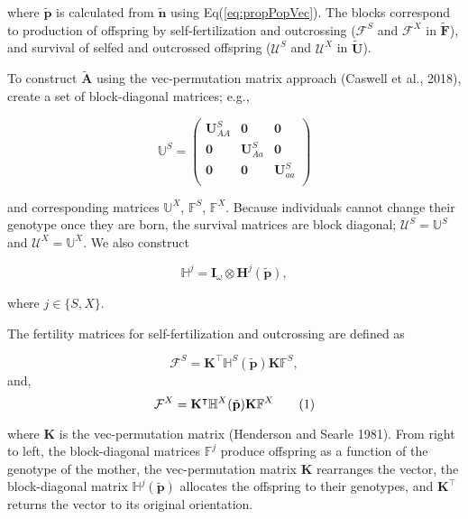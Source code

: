 \documentclass[11pt]{article}
\newcommand\numberthis{\addtocounter{equation}{1}\tag{\theequation}}
\def\mbf#1{\mathbf{#1}}
\def\mbb#1{\mathbb{#1}}
\def\mcal#1{\mathcal{#1}}
\begin{document}
\noindent where $\tilde{\mbf{p}}$ is calculated from $\tilde{\mbf{n}}$ using Eq(\ref{eq:propPopVec}). The blocks correspond to production of offspring by self-fertilization and outcrossing ($\mcal{F}^S$ and $\mcal{F}^X$ in $\tilde{\mbf{F}}$), and survival of selfed and outcrossed offspring ($\mcal{U}^S$ and $\mcal{U}^X$ in $\tilde{\mbf{U}}$). 


To construct $\tilde{\mbf{A}}$ using the vec-permutation matrix approach (Caswell et al., 2018), create a set of block-diagonal matrices; e.g.,

\begin{equation}
	\mbb{U}^S = 
		\left(
			\begin{array}{ccc}
				\mbf{U}^{S}_{AA} & \mbf{0} & \mbf{0} \\
				\mbf{0} & \mbf{U}^{S}_{Aa} & \mbf{0} \\
				\mbf{0} & \mbf{0} & \mbf{U}^{S}_{aa} \\
			\end{array} \right)
\end{equation}

\noindent and corresponding matrices $\mbb{U}^X$, $\mbb{F}^S$, $\mbb{F}^X$. Because individuals cannot change their genotype once they are born, the survival matrices are block diagonal; $\mcal{U}^S = \mbb{U}^S$ and $\mcal{U}^X = \mbb{U}^X$. We also construct

\begin{equation}
	\mbb{H}^j = \mbf{I}_{\omega} \otimes \mbf{H}^j(\tilde{\mbf{p}}),
\end{equation}

\noindent where $j \in \{S,X\}$.

The fertility matrices for self-fertilization and outcrossing are defined as

\begin{equation} \label{eq:FS}
	\mcal{F}^S = \mbf{K}^{\intercal} \mbb{H}^S(\tilde{\mbf{p}}) \mbf{K} \mbb{F}^S, 
\end{equation}
\noindent and, 
\begin{equation} \label{eq:FX}
	\mcal{F}^X = \mbf{K}^{\intercal} \mbb{H}^X(\tilde{\mbf{p}}) \mbf{K} \mbb{F}^X \numberthis
\end{equation}

\noindent where $\mbf{K}$ is the vec-permutation matrix (Henderson and Searle 1981). From right to left, the block-diagonal matrices $\mbb{F}^j$ produce offspring as a function of the genotype of the mother, the vec-permutation matrix $\mbf{K}$ rearranges the vector, the block-diagonal matrix $\mbb{H}^j(\tilde{\mbf{p}})$ allocates the offspring to their genotypes, and $\mbf{K}^{\intercal}$ returns the vector to its original orientation.
\end{document}
